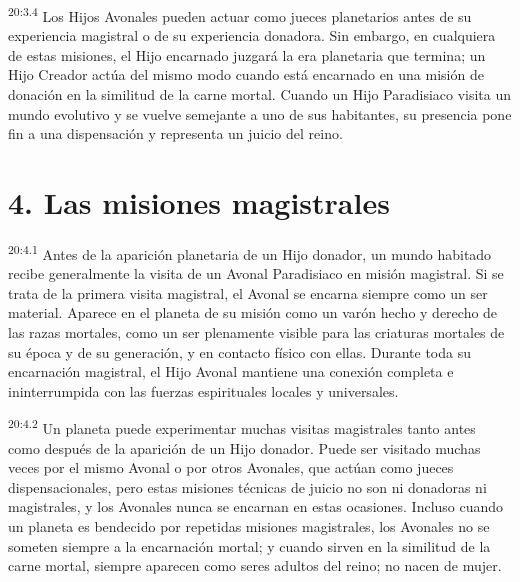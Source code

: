 \par
\textsuperscript{20:3.4} Los Hijos Avonales pueden actuar como jueces planetarios antes de su experiencia magistral o de su experiencia donadora. Sin embargo, en cualquiera de estas misiones, el Hijo encarnado juzgará la era planetaria que termina; un Hijo Creador actúa del mismo modo cuando está encarnado en una misión de donación en la similitud de la carne mortal. Cuando un Hijo Paradisiaco visita un mundo evolutivo y se vuelve semejante a uno de sus habitantes, su presencia pone fin a una dispensación y representa un juicio del reino.

\section*{4. Las misiones magistrales}
\par
\textsuperscript{20:4.1} Antes de la aparición planetaria de un Hijo donador, un mundo habitado recibe generalmente la visita de un Avonal Paradisiaco en misión magistral. Si se trata de la primera visita magistral, el Avonal se encarna siempre como un ser material. Aparece en el planeta de su misión como un varón hecho y derecho de las razas mortales, como un ser plenamente visible para las criaturas mortales de su época y de su generación, y en contacto físico con ellas. Durante toda su encarnación magistral, el Hijo Avonal mantiene una conexión completa e ininterrumpida con las fuerzas espirituales locales y universales.

\par
\textsuperscript{20:4.2} Un planeta puede experimentar muchas visitas magistrales tanto antes como después de la aparición de un Hijo donador. Puede ser visitado muchas veces por el mismo Avonal o por otros Avonales, que actúan como jueces dispensacionales, pero estas misiones técnicas de juicio no son ni donadoras ni magistrales, y los Avonales nunca se encarnan en estas ocasiones. Incluso cuando un planeta es bendecido por repetidas misiones magistrales, los Avonales no se someten siempre a la encarnación mortal; y cuando sirven en la similitud de la carne mortal, siempre aparecen como seres adultos del reino; no nacen de mujer.

